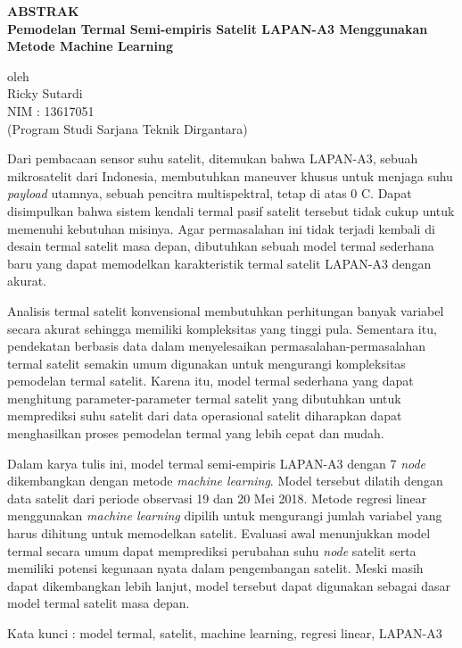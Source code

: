 \newpage

\begin{center}
       \Large
       \textbf{ABSTRAK} \\
        \vspace{1.5cm}
        \large
        \textbf{Pemodelan Termal Semi-empiris Satelit LAPAN-A3 Menggunakan Metode Machine Learning}\\
        
        \vspace{1.5cm}
        
        oleh\\
        Ricky Sutardi\\
        NIM : 13617051\\
        (Program Studi Sarjana Teknik Dirgantara)\\
        \vspace{1.5cm}
\end{center}

Dari pembacaan sensor suhu satelit, ditemukan bahwa LAPAN-A3, sebuah
mikrosatelit dari Indonesia, membutuhkan maneuver khusus untuk menjaga suhu
\textit{payload} utamnya, sebuah pencitra multispektral, tetap di atas 0
\degree C. Dapat disimpulkan bahwa sistem kendali termal pasif satelit tersebut
tidak cukup untuk memenuhi kebutuhan misinya. Agar permasalahan ini tidak
terjadi kembali di desain termal satelit masa depan, dibutuhkan sebuah model
termal sederhana baru yang dapat memodelkan karakteristik termal satelit
LAPAN-A3 dengan akurat.

Analisis termal satelit konvensional membutuhkan perhitungan banyak variabel
secara akurat sehingga memiliki kompleksitas yang tinggi pula. Sementara itu,
pendekatan berbasis data dalam menyelesaikan permasalahan-permasalahan termal
satelit semakin umum digunakan untuk mengurangi kompleksitas pemodelan termal
satelit. Karena itu, model termal sederhana yang dapat menghitung
parameter-parameter termal satelit yang dibutuhkan untuk memprediksi suhu
satelit dari data operasional satelit diharapkan dapat menghasilkan proses
pemodelan termal yang lebih cepat dan mudah.

Dalam karya tulis ini, model termal semi-empiris LAPAN-A3 dengan 7
\textit{node} dikembangkan dengan metode \textit{machine learning}. Model
tersebut dilatih dengan data satelit dari periode observasi 19 dan 20 Mei 2018.
Metode regresi linear menggunakan \textit{machine learning} dipilih untuk
mengurangi jumlah variabel yang harus dihitung untuk memodelkan satelit.
Evaluasi awal menunjukkan model termal secara umum dapat memprediksi perubahan
suhu \textit{node} satelit serta memiliki potensi kegunaan nyata dalam
pengembangan satelit. Meski masih dapat dikembangkan lebih lanjut, model
tersebut dapat digunakan sebagai dasar model termal satelit masa depan. 

\vspace{1.0cm}
\noindent 
Kata kunci : model termal, satelit, machine learning, regresi linear, LAPAN-A3
